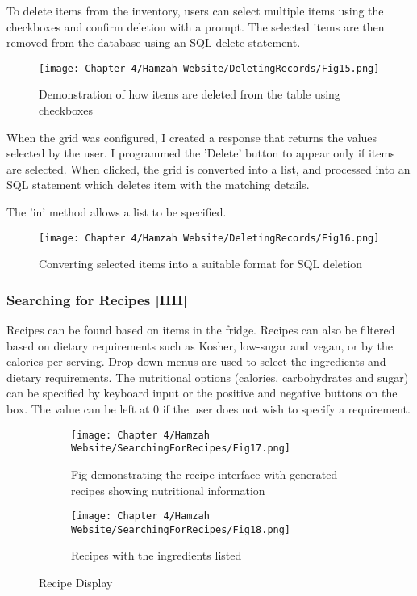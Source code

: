 To delete items from the inventory, users can select multiple items using the checkboxes and confirm deletion with a prompt.
The selected items are then removed from the database using an SQL delete statement.



\begin{figure}[H]        
    \centering
    \texttt{[image: Chapter 4/Hamzah Website/DeletingRecords/Fig15.png]}
    \caption{Demonstration of how items are deleted from the table using checkboxes}
\end{figure} 

When the grid was configured, I created a response that returns the values selected by the user.
I programmed the 'Delete' button to appear only if items are selected.
When clicked, the grid is converted into a list, and processed into an SQL statement which deletes item with the matching details.

The 'in' method allows a list to be specified.

\begin{figure}[H]        
    \centering
    \texttt{[image: Chapter 4/Hamzah Website/DeletingRecords/Fig16.png]}
    \caption{Converting selected items into a suitable format for SQL deletion}
\end{figure} 

\subsubsection{Searching for Recipes [HH]}

Recipes can be found based on items in the fridge.
Recipes can also be filtered based on dietary requirements such as Kosher, low-sugar and vegan, or by the calories per serving.
Drop down menus are used to select the ingredients and dietary requirements.
The nutritional options (calories, carbohydrates and sugar) can be specified by keyboard input or the positive and negative buttons on the box.
The  value can be left at 0 if the user does not wish to specify a requirement.

\begin{figure}[H]
    \begin{subfigure}{.5\textwidth}
        \centering
        \texttt{[image: Chapter 4/Hamzah Website/SearchingForRecipes/Fig17.png]}
        \caption{Fig demonstrating the recipe interface with generated recipes showing nutritional information}
    \end{subfigure}%
    \begin{subfigure}{.5\textwidth}
        \centering
        \texttt{[image: Chapter 4/Hamzah Website/SearchingForRecipes/Fig18.png]}
        \caption{Recipes with the ingredients listed}
    \end{subfigure}
    \caption{Recipe Display}
\end{figure}

